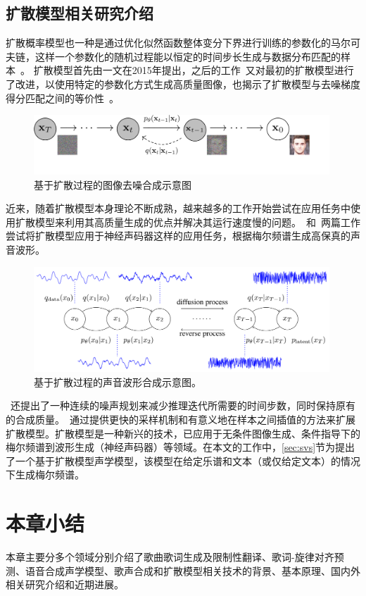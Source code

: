 \subsection{扩散模型相关研究介绍}
扩散概率模型也一种是通过优化似然函数整体变分下界进行训练的参数化的马尔可夫链，这样一个参数化的随机过程能以恒定的时间步长生成与数据分布匹配的样本~\citep{Ho2020ddpm}。
扩散模型首先由\citet{sohl2015deep}一文在2015年提出，之后的工作\citet{Ho2020ddpm}~又对最初的扩散模型进行了改进，以使用特定的参数化方式生成高质量图像，也揭示了扩散模型与去噪梯度得分匹配之间的等价性~\citep{song2019generative,song2021scorebased}。
\begin{figure}[htbp]
  \includegraphics[width=0.99\textwidth]{figure/related/ddpm.pdf}
  \caption{基于扩散过程的图像去噪合成示意图}
\end{figure}
近来，随着扩散模型本身理论不断成熟，越来越多的工作开始尝试在应用任务中使用扩散模型来利用其高质量生成的优点并解决其运行速度慢的问题。\citet{kong2021diffwave}~和\citet{chen2021wavegrad}~两篇工作尝试将扩散模型应用于神经声码器这样的应用任务，根据梅尔频谱生成高保真的声音波形。
\begin{figure}[htbp]
  \includegraphics[width=0.99\textwidth]{figure/related/diffwave.png}
  \caption{基于扩散过程的声音波形合成示意图\citep{kong2021diffwave}。}
\end{figure}
\citet{chen2021wavegrad}~还提出了一种连续的噪声规划来减少推理迭代所需要的时间步数，同时保持原有的合成质量。\citet{song2021denoising}~通过提供更快的采样机制和有意义地在样本之间插值的方法来扩展扩散模型。扩散模型是一种新兴的技术，已应用于无条件图像生成、条件指导下的梅尔频谱到波形生成（神经声码器）等领域。在本文的工作中，\ref{sec:svs}节为提出了一个基于扩散模型声学模型，该模型在给定乐谱和文本（或仅给定文本）的情况下生成梅尔频谱。
\section{本章小结}
本章主要分多个领域分别介绍了歌曲歌词生成及限制性翻译、歌词-旋律对齐预测、语音合成声学模型、歌声合成和扩散模型相关技术的背景、基本原理、国内外相关研究介绍和近期进展。
